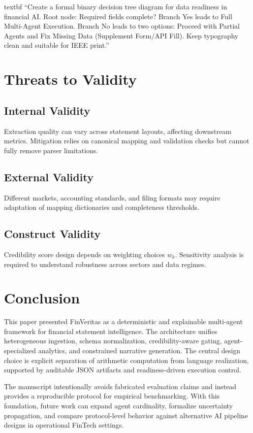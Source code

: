 \documentclass[conference]{IEEEtran}
\begin{document}
\csname textbf ``Create a formal binary decision tree diagram for data readiness in financial AI. Root node: Required fields complete? Branch Yes leads to Full Multi-Agent Execution. Branch No leads to two options: Proceed with Partial Agents and Fix Missing Data (Supplement Form/API Fill). Keep typography clean and suitable for IEEE print.''

\section{Threats to Validity}
\subsection{Internal Validity}
Extraction quality can vary across statement layouts, affecting downstream metrics. Mitigation relies on canonical mapping and validation checks but cannot fully remove parser limitations.

\subsection{External Validity}
Different markets, accounting standards, and filing formats may require adaptation of mapping dictionaries and completeness thresholds.

\subsection{Construct Validity}
Credibility score design depends on weighting choices $w_k$. Sensitivity analysis is required to understand robustness across sectors and data regimes.

\section{Conclusion}
This paper presented FinVeritas as a deterministic and explainable multi-agent framework for financial statement intelligence. The architecture unifies heterogeneous ingestion, schema normalization, credibility-aware gating, agent-specialized analytics, and constrained narrative generation. The central design choice is explicit separation of arithmetic computation from language realization, supported by auditable JSON artifacts and readiness-driven execution control.

The manuscript intentionally avoids fabricated evaluation claims and instead provides a reproducible protocol for empirical benchmarking. With this foundation, future work can expand agent cardinality, formalize uncertainty propagation, and compare protocol-level behavior against alternative AI pipeline designs in operational FinTech settings.
\end{document}
